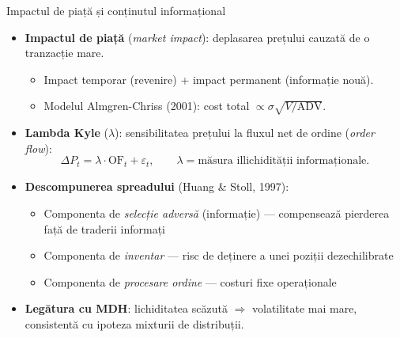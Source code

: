 \documentclass[9pt, aspectratio=169, t]{beamer}
\theoremstyle{definition}
\begin{document}
\begin{frame}{Impactul de piață și conținutul informațional}
\begin{itemize}\setlength{\itemsep}{2pt}
    \item \textbf{Impactul de piață} (\textit{market impact}): deplasarea prețului cauzată de o tranzacție mare.
    \begin{itemize}
        \item Impact temporar (revenire) + impact permanent (informație nouă).
        \item Modelul Almgren-Chriss (2001): cost total $\propto \sigma \sqrt{V/\text{ADV}}$.
    \end{itemize}
    \item \textbf{Lambda Kyle} ($\lambda$): sensibilitatea prețului la fluxul net de ordine (\textit{order flow}):
    \[
    \Delta P_t = \lambda \cdot \text{OF}_t + \varepsilon_t, \qquad \lambda = \text{măsura illichidității informaționale}.
    \]
    \item \textbf{Descompunerea spreadului} (Huang \& Stoll, 1997):
    \begin{itemize}
        \item Componenta de \textit{selecție adversă} (informație) --- compensează pierderea față de traderii informați
        \item Componenta de \textit{inventar} --- risc de deținere a unei poziții dezechilibrate
        \item Componenta de \textit{procesare ordine} --- costuri fixe operaționale
    \end{itemize}
    \item \textbf{Legătura cu MDH}: lichiditatea scăzută $\Rightarrow$ volatilitate mai mare, consistentă cu ipoteza mixturii de distribuții.
\end{itemize}
\end{frame}
\end{document}
